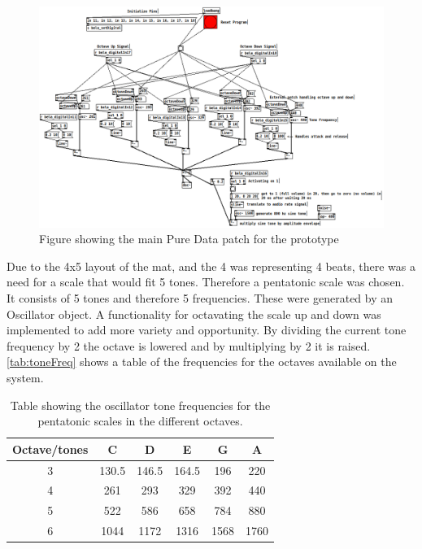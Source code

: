 	\begin{figure}[H]
		\centering
		\includegraphics[width=1\linewidth]{figure/Implementation/pdPatch}
		\caption{Figure showing the main Pure Data patch for the prototype}
		\label{fig:pdPatch}
	\end{figure}
	
	Due to the 4x5 layout of the mat, and the 4 was representing 4 beats, there was a need for a scale that would fit 5 tones. Therefore a pentatonic scale was chosen. It consists of 5 tones and therefore 5 frequencies. These were generated by an Oscillator object. A functionality for octavating the scale up and down was implemented to add more variety and opportunity. By dividing the current tone frequency by 2 the octave is lowered and by multiplying by 2 it is raised. \autoref{tab:toneFreq} shows a table of the frequencies for the octaves available on the system.
	
	\begin{table}[H]
		\centering
		\caption{Table showing the oscillator tone frequencies for the pentatonic scales in the different octaves.}
		\label{tab:toneFreq}
		\begin{tabular}{|c|c|c|c|c|c|}
			\hline
			Octave/tones & C     & D     & E     & G    & A    \\ \hline
			3            & 130.5 & 146.5 & 164.5 & 196  & 220  \\ \hline
			4            & 261   & 293   & 329   & 392  & 440  \\ \hline
			5            & 522   & 586   & 658   & 784  & 880  \\ \hline
			6            & 1044  & 1172  & 1316  & 1568 & 1760 \\ \hline
		\end{tabular}
	\end{table}
	



